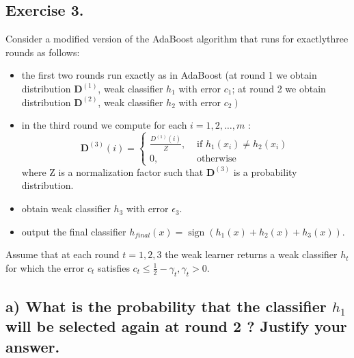 \documentclass[11pt, a4paper]{article}
\begin{document}
\begin{large}
\section{Exercise 3.}
Consider a modified version of the AdaBoost algorithm that runs for exactlythree rounds as follows:
\begin{itemize}
\item the first two rounds run exactly as in AdaBoost (at round 1 we obtain distribution $\mathbf{D}^{(1)}$, weak classifier $h_1$ with error $c_1$; at round 2 we obtain distribution $\mathbf{D}^{(2)}$, weak classifier $h_2$ with error $\left.c_2\right)$
\item in the third round we compute for each $i=1,2, \ldots, m$ :
$$
\mathbf{D}^{(3)}(i)= \begin{cases}\frac{D^{(1)}(i)}{Z}, & \text { if } h_1\left(x_i\right) \neq h_2\left(x_i\right) \\ 0, & \text { otherwise }\end{cases}
$$
where $\mathrm{Z}$ is a normalization factor such that $\mathbf{D}^{(3)}$ is a probability distribution.
\item obtain weak classifier $h_3$ with error $\epsilon_3$.
\item output the final classifier $h_{f i n a l}
(x)=\operatorname{sign}\left(h_1(x)+h_2(x)+h_3(x)\right)$.
\end{itemize}
Assume that at each round $t=1,2,3$ the weak learner returns a weak classifier $h_t$ for which the error $c_t$ satisfies $c_t \leq \frac{1}{2}-\gamma_t, \gamma_t>0$.
\\
\subsection{a) What is the probability that the classifier $h_1$ will be selected again at round 2 ? Justify your answer.}


\end{large}
\end{document}
